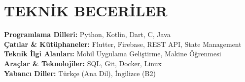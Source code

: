 \documentclass[11pt]{article}       %
\begin{document}
\vspace{-6.5pt}

\section*{TEKNİK BECERİLER}
\textbf{Programlama Dilleri:} Python, Kotlin, Dart, C, Java \\
\textbf{Çatılar \& Kütüphaneler:} Flutter, Firebase, REST API, State Management \\
\textbf{Teknik İlgi Alanları:} Mobil Uygulama Geliştirme, Makine Öğrenmesi \\
\textbf{Araçlar \& Teknolojiler:} SQL, Git, Docker, Linux \\
\textbf{Yabancı Diller:} Türkçe (Ana Dil), İngilizce (B2)
\end{document}
